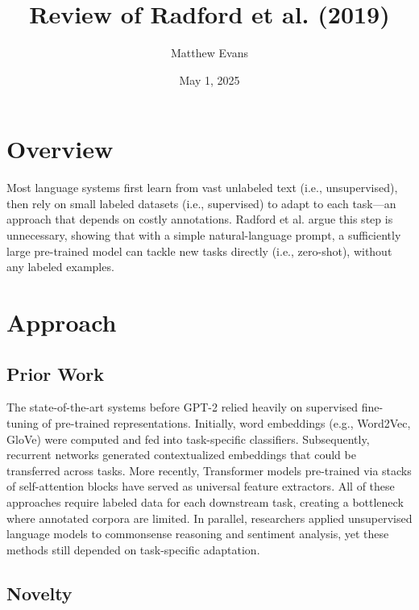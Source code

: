 \documentclass[10pt]{article}
\title{
    Review of Radford et al. (2019) \\
}
\author{Matthew Evans}
\date{May 1, 2025}
\begin{document}
\maketitle

\section*{Overview}
Most language systems first learn from vast unlabeled text (i.e., unsupervised), then rely on small labeled datasets (i.e., supervised) to adapt to each task—an approach that depends on costly annotations. Radford et al.\cite{radford2019language} argue this step is unnecessary, showing that with a simple natural-language prompt, a sufficiently large pre-trained model can tackle new tasks directly (i.e., zero-shot), without any labeled examples.

\section*{Approach}
\subsection*{Prior Work}
The state-of-the-art systems before GPT-2 relied heavily on supervised fine-tuning of pre-trained representations. Initially, word embeddings (e.g., Word2Vec, GloVe) were computed and fed into task-specific classifiers. Subsequently, recurrent networks generated contextualized embeddings that could be transferred across tasks. More recently, Transformer models pre-trained via stacks of self-attention blocks have served as universal feature extractors. All of these approaches require labeled data for each downstream task, creating a bottleneck where annotated corpora are limited. In parallel, researchers applied unsupervised language models to commonsense reasoning and sentiment analysis, yet these methods still depended on task-specific adaptation.

\subsection*{Novelty}
\end{document}
